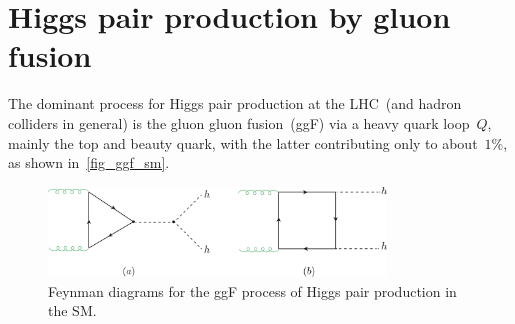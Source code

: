 \section{Higgs pair production by gluon fusion \label{ggFhh}  }
The dominant process for Higgs pair production at the LHC~(and hadron colliders in general) is the gluon gluon fusion~(ggF) via a heavy quark loop~$Q$, mainly the top and beauty quark, with the latter contributing only to about~$1\%$, as shown in~\autoref{fig_ggf_sm}.
%
\begin{figure}[!htpb]
	\centering
	\includegraphics[width = 0.8\textwidth]{./figures/di-higgs-LO-SM}
	\caption{Feynman diagrams for the ggF process of Higgs pair production in the SM.} 
	\label{fig_ggf_sm}
\end{figure}
%
